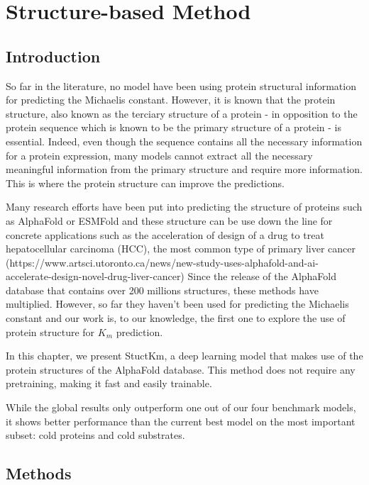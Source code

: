 
\chapter{Structure-based Method}

\section{Introduction}

So far in the literature, no model have been using protein structural information for predicting the Michaelis
constant. However, it is known that the protein structure, also known as the terciary structure of a protein - in
opposition to the protein sequence which is known to be the primary structure of a protein - is essential. Indeed,
even though the sequence contains all the necessary information for a protein expression, many models cannot
extract all the necessary meaningful information from the primary structure and require more information. This is
where the protein structure can improve the predictions. 

Many research efforts have been put into predicting the structure of proteins such as AlphaFold or ESMFold and
these structure can be use down the line for concrete applications such as the acceleration of design 
of a drug to treat hepatocellular carcinoma (HCC), the most common type of primary liver cancer (https://www.artsci.utoronto.ca/news/new-study-uses-alphafold-and-ai-accelerate-design-novel-drug-liver-cancer)
Since the release of the AlphaFold database that contains over 200 millions structures, these methods have multiplied.
However, so far they haven't been used for predicting the Michaelis constant and our work is, to our knowledge, 
the first one to explore the use of protein structure for $K_m$ prediction.

In this chapter, we present StuctKm, a deep learning model that makes use of the protein structures of the
AlphaFold database. This method does not require any pretraining, making it fast and easily trainable. 

While the global results only outperform one out of our four benchmark models, it shows better performance 
than the current best model on the most important subset: cold proteins and cold substrates.

\section{Methods}


